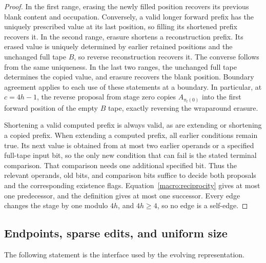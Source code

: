 \begin{proof}
In the first range, erasing the newly filled position recovers its
previous blank content and occupation.  Conversely, a valid longer
forward prefix has the uniquely prescribed value at its last
position, so filling its shortened prefix recovers it.  In the second
range, erasure shortens a reconstruction prefix.  Its erased value
is uniquely determined by earlier retained positions and the
unchanged full tape $B$, so reverse reconstruction recovers it.
The converse follows from the same uniqueness.  In the last two
ranges, the unchanged full tape determines the copied value,
and erasure recovers the blank position.  Boundary agreement applies
to each use of these statements at a boundary.  In particular,
at $c=4h-1$, the reverse proposal from stage zero copies
$A_{\pi_{\mathrm f}(0)}$ into the first forward position of the empty
$B$ tape, exactly reversing the wraparound erasure.

Shortening a valid computed prefix is always valid, as are extending
or shortening a copied prefix.  When extending a computed prefix,
all earlier conditions remain true.  Its next value is obtained
from at most two earlier operands or a specified full-tape input
bit, so the only new condition that can fail is the stated terminal
comparison.  That comparison needs one additional specified bit.
Thus the relevant operands, old bits, and comparison bits suffice
to decide both proposals and the corresponding existence flags.
Equation~\eqref{macro:reciprocity} gives at most one predecessor,
and the definition gives at most one successor.  Every edge changes
the stage by one modulo $4h$, and $4h\ge4$, so no edge is a self-edge.
\end{proof}

\subsection{Endpoints, sparse edits, and uniform size}
\label{macro:interface}

The following statement is the interface used by the evolving
representation.

